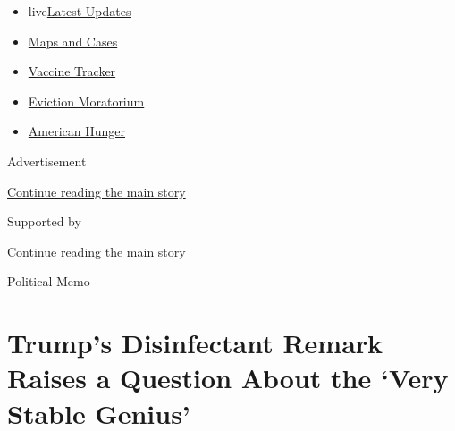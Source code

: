 \begin{itemize}
\tightlist
\item
  live\href{https://www.nytimes3xbfgragh.onion/2020/09/09/world/covid-19-coronavirus.html?name=styln-coronavirus-national\&region=TOP_BANNER\&block=storyline_menu_recirc\&action=click\&pgtype=Article\&impression_id=04cd4591-f292-11ea-8c52-a90ab0322ff1\&variant=undefined}{Latest
  Updates}
\item
  \href{https://www.nytimes3xbfgragh.onion/interactive/2020/us/coronavirus-us-cases.html?name=styln-coronavirus-national\&region=TOP_BANNER\&block=storyline_menu_recirc\&action=click\&pgtype=Article\&impression_id=04cd4592-f292-11ea-8c52-a90ab0322ff1\&variant=undefined}{Maps
  and Cases}
\item
  \href{https://www.nytimes3xbfgragh.onion/interactive/2020/science/coronavirus-vaccine-tracker.html?name=styln-coronavirus-national\&region=TOP_BANNER\&block=storyline_menu_recirc\&action=click\&pgtype=Article\&impression_id=04cd4593-f292-11ea-8c52-a90ab0322ff1\&variant=undefined}{Vaccine
  Tracker}
\item
  \href{https://www.nytimes3xbfgragh.onion/2020/09/02/your-money/eviction-moratorium-covid.html?name=styln-coronavirus-national\&region=TOP_BANNER\&block=storyline_menu_recirc\&action=click\&pgtype=Article\&impression_id=04cd6ca0-f292-11ea-8c52-a90ab0322ff1\&variant=undefined}{Eviction
  Moratorium}
\item
  \href{https://www.nytimes3xbfgragh.onion/interactive/2020/09/02/magazine/food-insecurity-hunger-us.html?name=styln-coronavirus-national\&region=TOP_BANNER\&block=storyline_menu_recirc\&action=click\&pgtype=Article\&impression_id=04cd6ca1-f292-11ea-8c52-a90ab0322ff1\&variant=undefined}{American
  Hunger}
\end{itemize}

Advertisement

\protect\hyperlink{after-top}{Continue reading the main story}

Supported by

\protect\hyperlink{after-sponsor}{Continue reading the main story}

Political Memo

\hypertarget{trumps-disinfectant-remark-raises-a-question-about-the-very-stable-genius}{%
\section{Trump's Disinfectant Remark Raises a Question About the `Very
Stable
Genius'}\label{trumps-disinfectant-remark-raises-a-question-about-the-very-stable-genius}}

